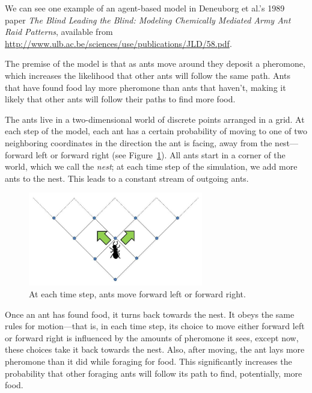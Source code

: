 \documentclass[10pt]{book}
\begin{document}
We can see one example of an agent-based model in Deneuborg et al.'s
1989 paper \emph{The Blind Leading the Blind: Modeling Chemically
  Mediated Army Ant Raid Patterns}, available from
\url{http://www.ulb.ac.be/sciences/use/publications/JLD/58.pdf}.

The premise of the model is that as ants move around they deposit
a pheromone, which increases the likelihood that other ants will follow
the same path. Ants that have found food lay more pheromone than ants
that haven't, making it likely that other ants will follow their paths
to find more food.

The ants live in a two-dimensional world of discrete points arranged
in a grid. At each step of the model, each ant has a certain
probability of moving to one of two neighboring coordinates in the
direction the ant is facing, away from the nest---forward left or
forward right (see Figure~\ref{fig.antchoice}). All ants start in a
corner of the world, which we call the \emph{nest}; at each time
step of the simulation, we add more ants to the nest. This leads to a
constant stream of outgoing ants.

\begin{figure}
\centerline{\includegraphics[width=3.0in]{figs/antchoice.jpg}}
\caption{At each time step, ants move forward left or forward right.\label{fig.antchoice}}
\end{figure}

Once an ant has found food, it turns back towards the nest. It obeys
the same rules for motion---that is, in each time step, its choice to
move either forward left or forward right is influenced by the amounts
of pheromone it sees, except now, these choices take it back towards
the nest. Also, after moving, the ant lays more pheromone than it did
while foraging for food. This significantly increases the probability
that other foraging ants will follow its path to find, potentially,
more food.
\end{document}
